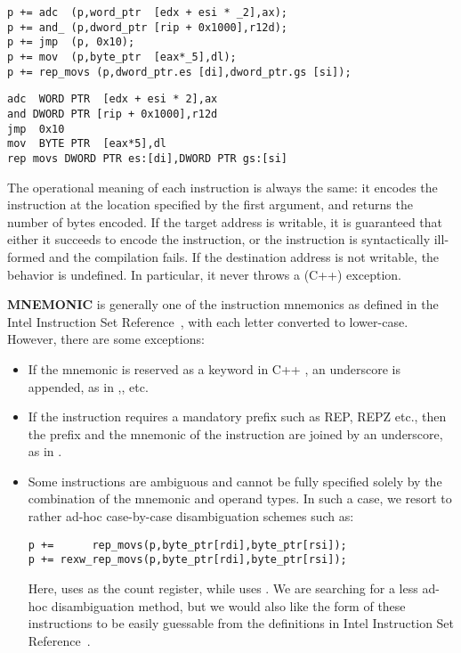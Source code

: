 \documentclass{article}
\begin{document}
\begin{lstlisting}[caption={Examples of ERASM++ instructions.},frame=single]
p += adc  (p,word_ptr  [edx + esi * _2],ax);
p += and_ (p,dword_ptr [rip + 0x1000],r12d);
p += jmp  (p, 0x10);
p += mov  (p,byte_ptr  [eax*_5],dl);
p += rep_movs (p,dword_ptr.es [di],dword_ptr.gs [si]);
\end{lstlisting}
\begin{lstlisting}[language={[x86masm]Assembler},caption={The corresponding MASM instructions.},frame=single]
adc  WORD PTR  [edx + esi * 2],ax
and DWORD PTR [rip + 0x1000],r12d
jmp  0x10
mov  BYTE PTR  [eax*5],dl
rep movs DWORD PTR es:[di],DWORD PTR gs:[si]
\end{lstlisting}

The operational meaning of each instruction is always the same: it
encodes the instruction at the location specified by the first
argument, and returns the number of bytes encoded. If the target
address is writable, it is guaranteed that either it succeeds to
encode the instruction, or the instruction is syntactically ill-formed
and the compilation fails. If the destination address is not writable,
the behavior is undefined. In particular, it never throws a (C++)
exception.


{\bf MNEMONIC} is generally one of the instruction mnemonics as
defined in the Intel Instruction Set Reference~\cite{intel:insn_ref},
with each letter converted to lower-case. However, there are some
exceptions:
\begin{itemize}
\item If the mnemonic is reserved as a keyword in C++ , an underscore
  is appended, as in ,, etc.
\item If the instruction requires a mandatory prefix such as
  REP, REPZ etc., then the prefix and the mnemonic of the
  instruction are joined by an underscore, as in .
\item Some instructions are ambiguous and cannot be fully specified
  solely by the combination of the mnemonic and operand types. In such
  a case, we resort to rather ad-hoc case-by-case disambiguation
  schemes such as:
\begin{lstlisting}[frame=single]
p +=      rep_movs(p,byte_ptr[rdi],byte_ptr[rsi]);
p += rexw_rep_movs(p,byte_ptr[rdi],byte_ptr[rsi]);    
\end{lstlisting}
  Here,  uses  as the count register, while  uses .
  We are searching for a less ad-hoc disambiguation method, but we would also
  like the form of these instructions to be easily guessable from the definitions
  in Intel Instruction Set Reference~\cite{intel:insn_ref}.
\end{itemize}
\end{document}
